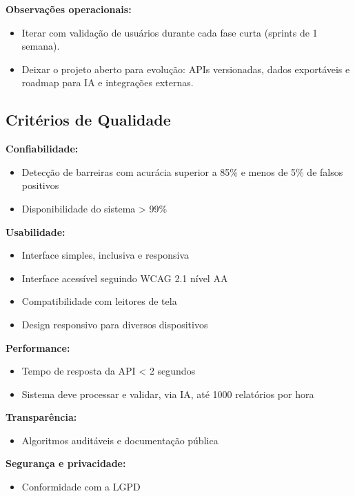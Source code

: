 \documentclass[12pt,a4paper]{article}
\begin{document}
\textbf{Observações operacionais:}
\begin{itemize}
    \item Iterar com validação de usuários durante cada fase curta (sprints de 1 semana).
    \item Deixar o projeto aberto para evolução: APIs versionadas, dados exportáveis e roadmap para IA e integrações externas.
\end{itemize}

\subsection{Critérios de Qualidade}
\label{subsec:criterios-qualidade}

\textbf{Confiabilidade:}
\begin{itemize}
    \item Detecção de barreiras com acurácia superior a 85\% e menos de 5\% de falsos positivos
    \item Disponibilidade do sistema \textgreater{} 99\%
\end{itemize}

\textbf{Usabilidade:}
\begin{itemize}
    \item Interface simples, inclusiva e responsiva
    \item Interface acessível seguindo WCAG 2.1 nível AA
    \item Compatibilidade com leitores de tela
    \item Design responsivo para diversos dispositivos
\end{itemize}

\textbf{Performance:}
\begin{itemize}
    \item Tempo de resposta da API \textless{} 2 segundos
    \item Sistema deve processar e validar, via IA, até 1000 relatórios por hora
\end{itemize}

\textbf{Transparência:}
\begin{itemize}
    \item Algoritmos auditáveis e documentação pública
\end{itemize}

\textbf{Segurança e privacidade:}
\begin{itemize}
    \item Conformidade com a LGPD
\end{itemize}
\end{document}
